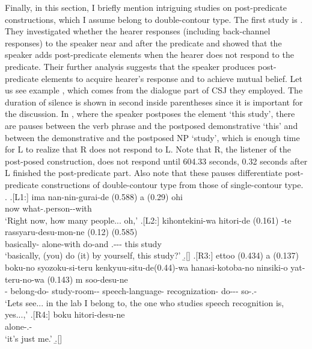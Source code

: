 Finally, in this section,
I briefly mention intriguing studies on post-predicate constructions,
which I assume belong to double-contour type.
The first study is .
They investigated whether the hearer responses (including back-channel responses) to the speaker near and after the predicate and showed that
the speaker adds post-predicate elements
when the hearer does not respond to the predicate.
Their further analysis suggests that the speaker produces post-predicate elements to acquire hearer's response and to achieve mutual belief.
Let us see example \Next,
which comes from the dialogue part of CSJ they employed.
The duration of silence is shown in second inside parentheses
since it is important for the discussion.
In \Next[-L2], where the speaker postposes the element  `this study',
there are pauses between the verb phrase and the postposed demonstrative  `this' and between the demonstrative and the postposed NP  `study',
which is enough time for L to realize that
R does not respond to L.
Note that R, the listener of the post-posed construction,
does not respond until 604.33 seconds,
0.32 seconds after L finished the post-predicate part.
Also note that
these pauses differentiate post-predicate constructions of double-contour type from those of single-contour type.
%
\ex.
 \ag.[L1:] ima nan-nin-gurai-de (0.588) a (0.29) ohi \\
           now what-.person--with {}  {}  \\
           `Right now, how many people... oh,'
 \bg.[L2:] kihontekini-wa hitori-de (0.161) -te rassyaru-desu-mon-ne
           (0.12)  (0.585)  \\
           basically- alone-with {} do-and .--- {} this {} study \\
           `basically, (you) do (it) by yourself, this study?'
 \b.[] 
 \bg.[R3:] ettoo (0.434) a (0.137) boku-no syozoku-si-teru kenkyuu-situ-de(0.44)-wa hanasi-kotoba-no ninsiki-o yat-teru-no-wa (0.143) m soo-desu-ne \\
            {}  {} - belong-do- study-room-- speech-language- recognization- do--- {}  so-.- \\
           `Lets see... in the lab I belong to, the one who studies speech recognition is, yes...,'
 \bg.[R4:] boku hitori-desu-ne \\
       alone-.- \\
      `it's just me.'
  \b.[] \hfill{\cite[287]{kakuden12}}


